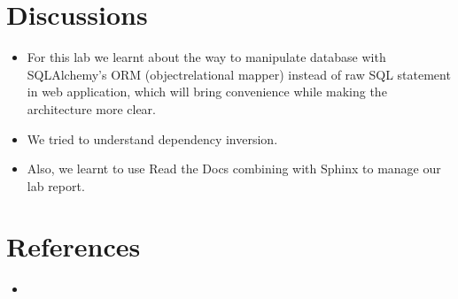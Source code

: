 \documentclass[letterpaper,10pt,english]{sphinxmanual}
\begin{document}
\chapter{Discussions}
\label{\detokenize{index:discussions}}\begin{itemize}
\item {} 
For this lab we learnt about the way to manipulate database with SQLAlchemy’s ORM (object\sphinxhyphen{}relational mapper) instead of raw SQL statement in web application, which will bring convenience while making the architecture more clear.

\item {} 
We tried to understand dependency inversion.

\item {} 
Also, we learnt to use Read the Docs combining with Sphinx to manage our lab report.

\end{itemize}


\chapter{References}
\label{\detokenize{index:references}}\begin{itemize}
\item {} 

\end{itemize}



\renewcommand{\indexname}{Index}
\printindex
\end{document}
